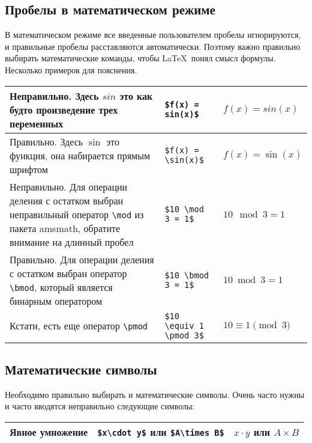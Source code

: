 \documentclass{article}
\begin{document}
    \subsection{Пробелы в математическом режиме}
    В математическом режиме все введенные пользователем пробелы игнорируются, и правильные пробелы расставляются автоматически.
    Поэтому важно правильно выбирать математические команды, чтобы \LaTeX\ понял смысл формулы.
    Несколько примеров для пояснения.

    \begin{table}[H]
        \begin{tabular}{|p{} | l  | l |}
            \hline
            Неправильно. Здесь $sin$ это как будто произведение трех переменных                                                                          & \verb|$f(x) = sin(x)$|  & $f(x) = sin(x)$  \\
            \hline
            Правильно. Здесь $\sin$ это функция, она набирается прямым шрифтом                                                                           & \verb|$f(x) = \sin(x)$| & $f(x) = \sin(x)$ \\
            \hline
            Неправильно. Для операции деления с остатком выбран неправильный оператор \verb|\mod| из пакета amsmath, обратите внимание на длинный пробел & \verb|$10 \mod 3 = 1$|  & $10 \mod 3 = 1$  \\
            \hline
            Правильно. Для операции деления с остатком выбран оператор \verb|\bmod|, который является бинарным оператором & \verb|$10 \bmod 3 = 1$| & $10 \bmod 3 = 1$ \\
            \hline
            Кстати, есть еще оператор \verb|\pmod| & \verb|$10 \equiv 1 \pmod 3$| & $10 \equiv 1 \pmod 3$ \\
            \hline
        \end{tabular}
    \end{table}

    \subsection{Математические символы}
    Необходимо правильно выбирать и математические символы. Очень часто нужны и часто вводятся неправильно следующие символы:
    \begin{table}[H]
        \begin{tabular}{|p{} | l  | l |}
            \hline
            Явное умножение & \verb|$x\cdot y$| или \verb|$A\times B$| & $x\cdot y$ или $A\times B$  \\
            \hline
        \end{tabular}
    \end{table}
\end{document}
